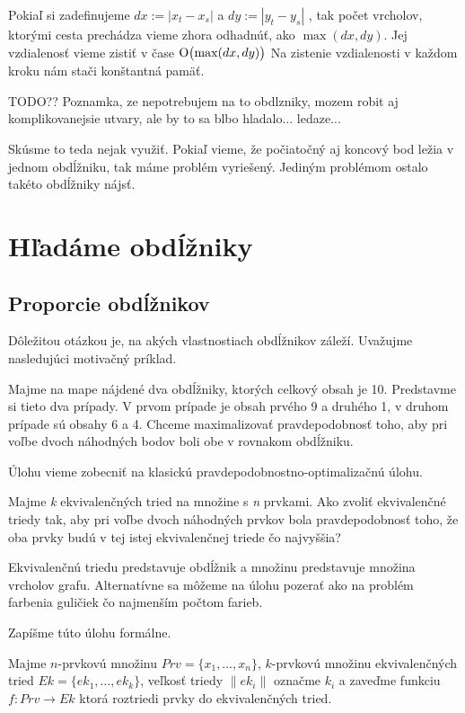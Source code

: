 Pokiaľ si zadefinujeme 
$ dx := |x_t - x_s|$ 
a
$ dy :=|y_t - y_s| $
 , tak počet vrcholov,
ktorými cesta prechádza vieme zhora odhadnúť, ako $\max(dx, dy)$. Jej vzdialenosť vieme zistiť v čase  $\operatorname{O}\bigl(\max(dx, dy)\bigr)$
Na zistenie vzdialenosti v každom kroku nám stači konštantná pamäť.

TODO?? Poznamka, ze nepotrebujem na to obdlzniky, mozem robit aj komplikovanejsie utvary, ale by to sa blbo hladalo... ledaze...

Skúsme to teda nejak využiť. Pokiaľ vieme, že počiatočný aj koncový bod ležia v jednom obdĺžniku, tak máme problém vyriešený. 
Jediným problémom ostalo takéto obdĺžniky nájsť. 


\section{Hľadáme obdĺžniky}


\subsection{Proporcie obdĺžnikov}
Dôležitou otázkou je, na akých vlastnostiach obdĺžnikov záleží. Uvažujme nasledujúci motivačný príklad.
\begin{example}
Majme na mape nájdené dva obdĺžniky, ktorých celkový obsah je 10.
Predstavme si tieto dva prípady. V prvom prípade je obsah prvého 9 a druhého 1, v druhom prípade sú obsahy 6 a 4. 
Chceme maximalizovať pravdepodobnosť toho, aby pri voľbe dvoch náhodných bodov boli obe v rovnakom obdĺžniku.
\end{example}


Úlohu vieme zobecniť na klasickú pravdepodobnostno-optimalizačnú úlohu.

\begin{example}
Majme {\sl k} ekvivalenčných tried na množine s {\sl n} prvkami. Ako zvoliť ekvivalenčné triedy tak, 
aby pri voľbe dvoch náhodných prvkov bola pravdepodobnosť toho, 
že oba prvky budú v tej istej ekvivalenčnej triede čo najvyššia?
\end{example}

\begin{note}
Ekvivalenčnú triedu predstavuje obdĺžnik a množinu predstavuje množina vrcholov grafu.
Alternatívne sa môžeme na úlohu pozerať ako na problém farbenia guličiek čo najmenším počtom farieb.
\end{note}

Zapíšme túto úlohu formálne.


Majme $n$-prvkovú množinu $Prv = \{x_1,\ldots,x_n\}$, $k$-prvkovú množinu ekvivalenčných tried $Ek = \{ek_1,\ldots, ek_k\}$, veľkosť 
triedy $\|ek_i\|$ označme $k_i$ a zaveďme funkciu $f \colon Prv \to Ek$ ktorá roztriedi prvky do ekvivalenčných tried.

